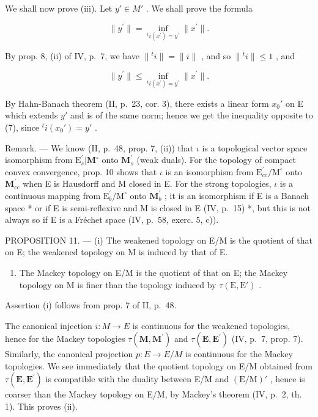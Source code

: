 We shall now prove (iii). Let \(y' \in M'\) . We shall prove the formula

\[
\| y ^ {\prime} \| = \inf _ {{}^t i (x ^ {\prime}) = y ^ {\prime}} \| x ^ {\prime} \|.\tag{6}
\]

By prop. 8, (ii) of IV, p.~7, we have \(\| {}^t i\| = \| i\|\) , and so \(\| {}^t i\| \leqslant 1\) , and

\[
\| y ^ {\prime} \| \leqslant \inf _ {{}^t i (x ^ {\prime}) = y ^ {\prime}} \| x ^ {\prime} \|.\tag{7}
\]

By Hahn-Banach theorem (II, p.~23, cor. 3), there exists a linear form \(x_0'\) on E which extends \(y'\) and is of the same norm; hence we get the inequality opposite to (7), since \({}^t i(x_0') = y'\) .

Remark. --- We know (II, p.~48, prop. 7, (ii)) that \(\iota\) is a topological vector space isomorphism from \(\mathrm{E}_s^{\prime}|\mathbf{M}^{\circ}\) onto \(\mathbf{M}_s^\prime\) (weak duals). For the topology of compact convex convergence, prop. 10 shows that \(\iota\) is an isomorphism from \(\mathrm{E}_{cc}^{\prime}/\mathrm{M}^{\circ}\) onto \(\mathbf{M}_{cc}^{\prime}\) when E is Hausdorff and M closed in E. For the strong topologies, \(\iota\) is a continuous mapping from \(\mathrm{E}_b^{\prime}/\mathrm{M}^{\circ}\) onto \(\mathbf{M}_b^{\prime}\) ; it is an isomorphism if E is a Banach space * or if E is semi-reflexive and M is closed in E (IV, p.~15) *, but this is not always so if E is a Fréchet space (IV, p.~58, exerc. 5, c)).

PROPOSITION 11. --- (i) The weakened topology on E/M is the quotient of that on E; the weakened topology on M is induced by that of E.

\begin{enumerate}
\def\labelenumi{(\roman{enumi})}
\setcounter{enumi}{1}
\tightlist
\item
  The Mackey topology on E/M is the quotient of that on E; the Mackey topology on M is finer than the topology induced by \(\tau(\mathrm{E}, \mathrm{E}')\) .
\end{enumerate}

Assertion (i) follows from prop. 7 of II, p.~48.

The canonical injection \(i:M\to E\) is continuous for the weakened topologies, hence for the Mackey topologies \(\tau(\mathbf{M},\mathbf{M}^{\prime})\) and \(\tau(\mathbf{E},\mathbf{E}^{\prime})\) (IV, p.~7, prop. 7). Similarly, the canonical projection \(p:E\to E/M\) is continuous for the Mackey topologies. We see immediately that the quotient topology on E/M obtained from \(\tau(\mathbf{E},\mathbf{E}^{\prime})\) is compatible with the duality between E/M and \((\mathrm{E}/\mathrm{M})'\) , hence is coarser than the Mackey topology on E/M, by Mackey's theorem (IV, p.~2, th. 1). This proves (ii).

